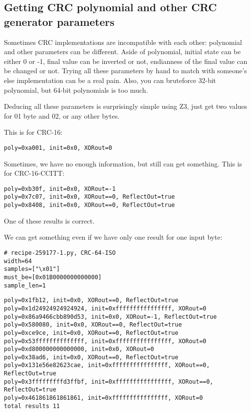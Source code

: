 \subsection{Getting CRC polynomial and other CRC generator parameters}

Sometimes CRC implementations are incompatible with each other: polynomial and other parameters can be different.
Aside of polynomial, initial state can be either 0 or -1, final value can be inverted or not, endianness of the final value can be changed or not.
Trying all these parameters by hand to match with someone's else implementation can be a real pain.
Also, you can bruteforce 32-bit polynomial, but 64-bit polynomials is too much.

Deducing all these parameters is surprisingly simple using Z3, just get two values for 01 byte and 02, or any other bytes.



This is for CRC-16:

\begin{lstlisting}
poly=0xa001, init=0x0, XORout=0
\end{lstlisting}

Sometimes, we have no enough information, but still can get something. This is for CRC-16-CCITT:

\begin{lstlisting}
poly=0xb30f, init=0x0, XORout=-1
poly=0x7c07, init=0x0, XORout==0, ReflectOut=true
poly=0x8408, init=0x0, XORout==0, ReflectOut=true
\end{lstlisting}

One of these results is correct.

We can get something even if we have only one result for one input byte:

\begin{lstlisting}[style=custompy]
# recipe-259177-1.py, CRC-64-ISO
width=64
samples=["\x01"]
must_be=[0x01B0000000000000]
sample_len=1
\end{lstlisting}

\begin{lstlisting}
poly=0x1fb12, init=0x0, XORout==0, ReflectOut=true
poly=0x1d24924924924924, init=0xffffffffffffffff, XORout=0
poly=0x86a9466cbb890d53, init=0x0, XORout=-1, ReflectOut=true
poly=0x580080, init=0x0, XORout==0, ReflectOut=true
poly=0xce9ce, init=0x0, XORout==0, ReflectOut=true
poly=0x53ffffffffffffff, init=0xffffffffffffffff, XORout=0
poly=0xd800000000000000, init=0x0, XORout=0
poly=0x38ad6, init=0x0, XORout==0, ReflectOut=true
poly=0x131e56e82623cae, init=0xffffffffffffffff, XORout==0, ReflectOut=true
poly=0x3fffffffffd3ffbf, init=0xffffffffffffffff, XORout==0, ReflectOut=true
poly=0x461861861861861, init=0xffffffffffffffff, XORout=0
total results 11
\end{lstlisting}

